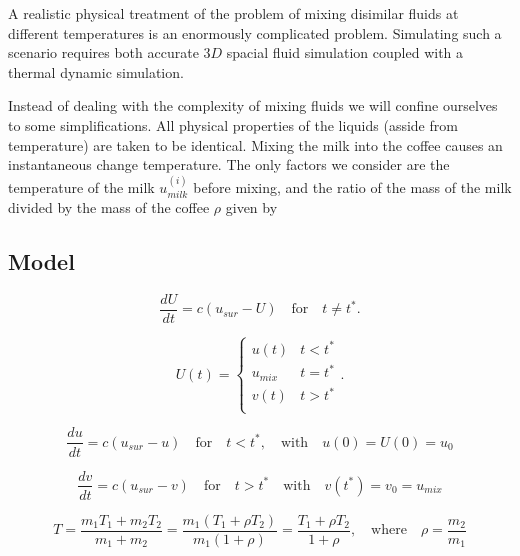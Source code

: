 \documentclass[11pt,oneside]{extarticle}
\numberwithin{equation}{section}
\numberwithin{figure}{section}
\begin{document}
\par A realistic physical treatment of the problem of mixing disimilar fluids at
different temperatures is an enormously complicated problem. Simulating such a
scenario requires both accurate $3D$ spacial fluid simulation coupled with a 
thermal dynamic simulation.

\par Instead of dealing with the complexity of mixing fluids we will confine
ourselves to some simplifications. All physical properties of the liquids
(asside from temperature) are taken to be identical. Mixing the milk into the
coffee causes an instantaneous change temperature. The only factors we consider
are the temperature of the milk $u_{milk}^{(i)}$ before mixing, and the ratio of the mass
of the milk divided by the mass of the coffee $\rho$ given by

\subsection{Model}

\begin{equation}
    \frac{dU}{dt} = c( u_{sur} - U) \quad\text{for}\quad t \neq t^*.
\end{equation}

\begin{equation}
    \label{eq:model2}
    U(t) = 
    \begin{cases} 
        u(t)                &   t < t^* \\
        u_{mix}             & t = t^* \\
        v(t)                &   t > t^* \\
    \end{cases}.
\end{equation}

\begin{equation}
    \frac{du}{dt} = c(u_{sur} - u)\quad\text{for}\quad t < t^*,
    \quad\text{with}\quad
    u(0) = U(0) = u_0 
\end{equation}

\begin{equation}
    \frac{dv}{dt} = c(u_{sur} - v)\quad\text{for}\quad t > t^*
    \quad\text{with}\quad
    v(t^*) = v_0 = u_{mix}
\end{equation}

\begin{equation}
    \label{eq:mix}
    T = \frac{m_1T_1 + m_2T_2}{m_1+m_2}
    =
    \frac{m_1(T_1 + \rho T_2)}{m_1(1+\rho)}
    =
    \frac{ T_1 + \rho T_2 }{ 1 + \rho },
    \quad\text{where}\quad
    \rho = \frac{m_2}{m_1}
\end{equation}
\end{document}
